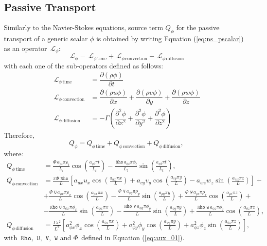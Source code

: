 \documentclass[10pt]{article}
\newcommand{\Diff}[2] {\dfrac{\partial( #1)}{\partial #2}}
\newcommand{\diff}[2] {\dfrac{\partial #1}{\partial #2}}
\newcommand{\Rho}{\,\mathtt{Rho}}
\newcommand{\U}{\,\mathtt{U}}
\newcommand{\V}{\,\mathtt{V}}
\newcommand{\W}{\,\mathtt{W}}
\newcommand{\Lo}{\,\mathcal{L}}
\newcommand{\convection}{\text{convection}}
\begin{document}
\subsection{Passive Transport}
Similarly to the Navier-Stokes equations, source term $Q_\phi$ for the passive transport of a generic scalar $\phi$ is obtained by writing Equation (\ref{eq:ns_pscalar}) as an operator $\Lo_\phi$:
 $$\Lo_\phi = \Lo_{\phi \, \text{time}}+\Lo_{\phi \, \convection}+\Lo_{\phi \, \text{diffusion}}$$
with each one of the sub-operators defined as follows:
\begin{equation*}
 \begin{split}
\Lo_{\phi \, \text{time}}&= \Diff{\rho\phi}{t} \\
\Lo_{\phi \, \convection}&= \Diff{\rho u \phi}{x} + \Diff{\rho v \phi}{y} + \Diff{\rho w \phi}{z}\\
\Lo_{\phi \,\text{diffusion}}&= - \Gamma \left( \diff{^2 \phi}{x^2} +\diff{^2 \phi}{y^2} + \diff{^2 \phi}{z^2} \right)
 \end{split}
\end{equation*}
%
Therefore, $$Q_\phi = Q_{\phi \, \text{time}}+Q_{\phi \, \convection}+Q_{\phi \, \text{diffusion}},$$
where:
\begin{equation}
 \begin{split}
 Q_{\phi \, \text{time}}&= 
\frac{\Phi \,  a_{\rho t} \pi \rho_{t} }{L_t}\cos\left(\frac{a_{\rho t} \pi t}{L_t}\right) - \frac{\Rho \, a_{\phi t} \pi \phi_{t} }{L_t}\sin\left(\frac{a_{\phi t} \pi t}{L_t}\right), \\
%
%
 Q_{\phi \, \text{convection}}&= 
\frac{\pi \Phi \,  \Rho \, }{L} \left[a_{ux} u_{x} \cos\left(\frac{a_{ux} \pi x}{L}\right) + a_{vy} v_{y} \cos\left(\frac{a_{vy} \pi y}{L}\right) - a_{wz} w_{z} \sin\left(\frac{a_{wz} \pi z}{L}\right)\right]+ \\ 
&+ \frac{\Phi \,  \U \, a_{\rho x} \pi \rho_{x} }{L}\cos\left(\frac{a_{\rho x} \pi x}{L}\right) - \frac{\Phi \,  \V \, a_{\rho y} \pi \rho_{y} }{L}\sin\left(\frac{a_{\rho y} \pi y}{L}\right) + \frac{\Phi \,  \W \, a_{\rho z} \pi \rho_{z} }{L}\cos\left(\frac{a_{\rho z} \pi z}{L}\right) + \\ 
&- \frac{ \Rho \, \U \, a_{\phi x} \pi\phi_{x} }{L}\sin\left(\frac{a_{\phi x} \pi x}{L}\right) - \frac{\Rho \, \V \, a_{\phi y} \pi \phi_{y} }{L}\sin\left(\frac{a_{\phi y} \pi y}{L}\right)+ \frac{\Rho \, \W \, a_{\phi z} \pi \phi_{z} }{L}\cos\left(\frac{a_{\phi z} \pi z}{L}\right) , \\
%
%
 Q_{\phi \, \text{diffusion}}&= 
\frac{\Gamma \pi^{2} }{L^2} \left[a_{\phi x}^{2} \phi_{x} \cos\left(\frac{a_{\phi x} \pi x}{L}\right) + a_{\phi y}^{2} \phi_{y} \cos\left(\frac{a_{\phi y} \pi y}{L}\right) + a_{\phi z}^{2} \phi_{z} \sin\left(\frac{a_{\phi z} \pi z}{L}\right)\right],
 \end{split}
\end{equation}
with $\Rho,\,\U,\,\V,\,\W$ and $\Phi \, $ defined in Equation (\ref{eq:aux_01}).
\end{document}
